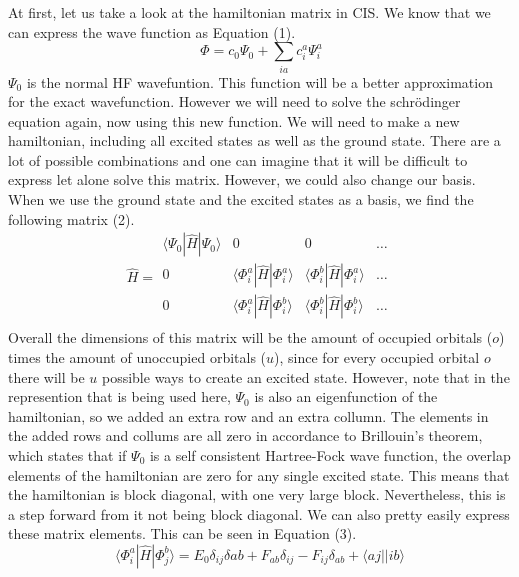 \documentclass{article}
\begin{document}
At first, let us take a look at the hamiltonian matrix in CIS. We know that we can express the wave function as Equation (1).
\begin{equation} \
    \Phi = c_0\Psi_0 + \sum_{ia} c^a_i\Psi^a_i
\end{equation}
$\Psi_0$ is the normal HF wavefuntion. This function will be a better approximation for the exact wavefunction. However we will need to solve the schrödinger equation again, now using this new function. We will need to make a new hamiltonian, including all excited states as well as the ground state. There are a lot of possible combinations and one can imagine that it will be difficult to express let alone solve this matrix. However, we could also change our basis. When we use the ground state and the excited states as a basis, we find the following matrix (2).
\begin{equation}
    \hat{H} = \begin{matrix}
                    \langle \Psi_0 |\hat{H}|\Psi_0 \rangle & 0 & 0 & \dots \\  
                    0 & \langle \Phi_i^a |\hat{H}|\Phi_i^a \rangle & \langle \Phi_i^b |\hat{H}|\Phi_i^a \rangle & \dots\\
                    0 & \langle \Phi_i^a |\hat{H}|\Phi_i^b \rangle & \langle \Phi_i^b |\hat{H}|\Phi_i^b \rangle & \dots\\
                \end{matrix}
\end{equation}
Overall the dimensions of this matrix will be the amount of occupied orbitals ($o$) times the amount of unoccupied orbitals ($u$), since for every occupied orbital $o$ there will be $u$ possible ways to create an excited state. However, note that in the represention that is being used here, $\Psi_0$ is also an eigenfunction of the hamiltonian, so we added an extra row and an extra collumn. The elements in the added rows and collums are all zero in accordance to Brillouin's theorem, which states that if $\Psi_0$ is a self consistent Hartree-Fock wave function, the overlap elements of the hamiltonian are zero for any single excited state. This means that the hamiltonian is block diagonal, with one very large block. Nevertheless, this is a step forward from it not being block diagonal. We can also pretty easily express these matrix elements. This can be seen in Equation (3).
\begin{equation}\tag{3}
\langle \Phi_i^a |\hat{H}| \Phi_j^b \rangle = E_0\delta_{ij}\delta{ab} + F_{ab}\delta_{ij} - F_{ij}\delta_{ab} + \langle aj|| ib \rangle
\end{equation}
\end{document}
